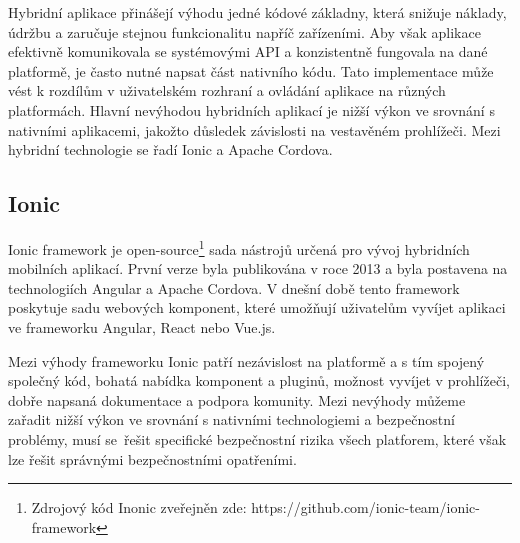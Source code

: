 \documentclass[czech, bc, kiv, he, iso690numb]{fasthesis}
\begin{document}

Hybridní aplikace přinášejí výhodu jedné kódové základny, která snižuje náklady, údržbu a zaručuje stejnou funkcionalitu napříč zařízeními. Aby však aplikace efektivně komunikovala se systémovými \gls{API} a konzistentně fungovala na dané platformě, je často nutné napsat část nativního kódu. Tato implementace může vést k rozdílům v uživatelském rozhraní a ovládání aplikace na různých platformách. Hlavní nevýhodou hybridních aplikací je nižší výkon ve srovnání s nativními aplikacemi, jakožto důsledek závislosti na vestavěném prohlížeči. Mezi hybridní technologie se řadí Ionic a Apache Cordova. \cite{appflyer-hybrid-app} \cite{hybrid-mobile-app-development}


\subsection{Ionic} \label{Ionic}

Ionic framework je open-source\footnote{Zdrojový kód Inonic zveřejněn zde: https://github.com/ionic-team/ionic-framework} sada nástrojů určená pro vývoj hybridních mobilních aplikací. První verze byla publikována v roce 2013 a byla postavena na technologiích Angular a Apache Cordova. V dnešní době tento framework poskytuje sadu webových komponent, které umožňují uživatelům vyvíjet aplikaci ve frameworku Angular, React nebo Vue.js. \cite{Ionic_framework}

Mezi výhody frameworku Ionic patří nezávislost na platformě a s tím spojený společný kód, bohatá nabídka komponent a pluginů, možnost vyvíjet v prohlížeči, dobře napsaná dokumentace a podpora komunity. Mezi nevýhody můžeme zařadit nižší výkon ve srovnání s nativními technologiemi a bezpečnostní problémy, musí se~řešit specifické bezpečnostní rizika všech platforem, které však lze řešit správnými bezpečnostními opatřeními. \cite{Pokorska_2022}
\end{document}
